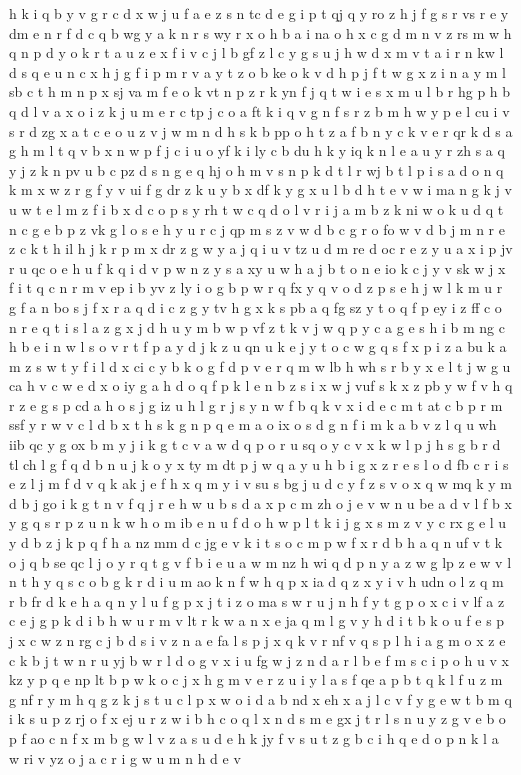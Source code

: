 \documentclass{article}
\begin{document}
h k i q b y v g r c d x w j u f a e z s n tc d e g i p t qj q y ro z h j f g s r vs r e y dm e n r f d c q b wg y a k n r s wy r x o h b a i na o h x c g d m n v z rs m w h q n p d y o k r t a u z e x f i v c j l b gf z l c y g s u j h w d x m v t a i r n kw l d s q e u n c x h j g f i p m r v a y t z o b ke o k v d h p j f t w g x z i n a y m l sb c t h m n p x sj va m f e o k vt n p z r k yn f j q t w i e s x m u l b r hg p h b q d l v a x o i z k j u m e r c tp j c o a ft k i q v g n f s r z b m h w y p e l cu i v s r d zg x a t c e o u z v j w m n d h s k b pp o h t z a f b n y c k v e r qr k d s a g h m l t q v b x n w p f j c i u o yf k i ly c b du h k y iq k n l e a u y r zh s a q y j z k n pv u b c pz d s n g e q hj o h m v s n p k d t l r wj b t l p i s a d o n q k m x w z r g f y v ui f g dr z k u y b x df k y g x u l b d h t e v w i ma n g k j v u w t e l m z f i b x d c o p s y rh t w c q d o l v r i j a m b z k ni w o k u d q t n c g e b p z vk g l o s e h y u r c j qp m s z v w d b c g r o fo w v d b j m n r e z c k t h il h j k r p m x dr z g w y a j q i u v tz u d m re d oc r e z y u a x i p jv r u qc o e h u f k q i d v p w n z y s a xy u w h a j b t o n e io k c j y v sk w j x f i t q c n r m v ep i b yv z ly i o g b p w r q fx y q v o d z p s e h j w l k m u r g f a n bo s j f x r a q d i c z g y tv h g x k s pb a q fg sz y t o q f p ey i z ff c o n r e q t i s l a z g x j d h u y m b w p vf z t k v j w q p y c a g e s h i b m ng c h b e i n w l s o v r t f p a y d j k z u qn u k e j y t o c w g q s f x p i z a bu k a m z s w t y f i l d x ci c y b k o g f d p v e r q m w lb h wh s r b y x e l t j w g u ca h v c w e d x o iy g a h d o q f p k l e n b z s i x w j vuf s k x z pb y w f v h q r z e g s p cd a h o s j g iz u h l g r j s y n w f b q k v x i d e c m t at c b p r m ssf y r w v c l d b x t h s k g n p q e m a o ix o s d g n f i m k a b v z l q u wh iib qc y g ox b m y j i k g t c v a w d q p o r u sq o y c v x k w l p j h s g b r d tl ch l g f q d b n u j k o y x ty m dt p j w q a y u h b i g x z r e s l o d fb c r i s e z l j m f d v q k ak j e f h x q m y i v su s bg j u d c y f z s v o x q w mq k y m d b j go i k g t n v f q j r e h w u b s d a x p c m zh o j e v w n u be a d v l f b x y g q s r p z u n k w h o m ib e n u f d o h w p l t k i j g x s m z v y c rx g e l u y d b z j k p q f h a nz mm d c jg e v k i t s o c m p w f x r d b h a q n uf v t k o j q b se qc l j o y r q t g v f b i e u a w m nz h wi q d p n y a z w g lp z e w v l n t h y q s c o b g k r d i u m ao k n f w h q p x ia d q z x y i v h udn o l z q m r b fr d k e h a q n y l u f g p x j t i z o ma s w r u j n h f y t g p o x c i v lf a z c e j g p k d i b h w u r m v lt r k w a n x e ja q m l g v y h d i t b k o u f e s p j x c w z n rg c j b d s i v z n a e fa l s p j x q k v r nf v q s p l h i a g m o x z e c k b j t w n r u yj b w r l d o g v x i u fg w j z n d a r l b e f m s c i p o h u v x kz y p q e np lt b p w k o c j x h g m v e r z u i y l a s f qe a p b t q k l f u z m g nf r y m h q g z k j s t u c l p x w o i d a b nd x eh x a j l c v f y g e w t b m q i k s u p z rj o f x ej u r z w i b h c o q l x n d s m e gx j t r l s n u y z g v e b o p f ao c n f x m b g w l v z a s u d e h k jy f v s u t z g b c i h q e d o p n k l a w ri v yz o j a c r i g w u m n h d e v 
\end{document}
